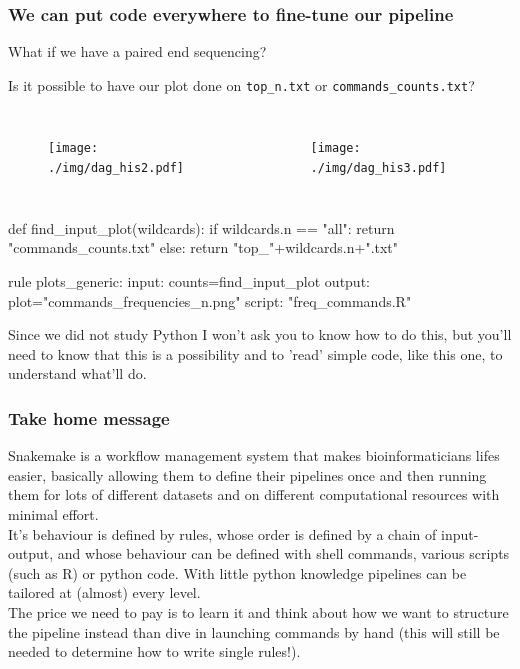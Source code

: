 \documentclass[xcolor=table]{beamer}
\begin{document}
\begin{frame}
\frametitle{We can put code everywhere to fine-tune our pipeline}
What if we have a paired end sequencing?

Is it possible to have our plot done on \texttt{top\_n.txt} or \texttt{commands\_counts.txt}?
\begin{columns}
\begin{figure}\texttt{[image: ./img/dag\_his2.pdf]}\end{figure}
\begin{figure}\texttt{[image: ./img/dag\_his3.pdf]}\end{figure}
\end{columns}
\end{frame}


\begin{frame}[fragile]
\begin{python}[basicstyle=\small]
def find_input_plot(wildcards):
   if wildcards.n == "all":
      return "commands_counts.txt"
   else:
      return "top_"+wildcards.n+".txt"

rule plots_generic:
   input: counts=find_input_plot
   output: plot="commands_frequencies_{n}.png"
   script: "freq_commands.R"
\end{python}
\tiny{Since we did not study Python I won't ask you to know how to do this, but you'll need to know that this is a possibility and to 'read' simple code,
like this one, to understand what'll do.}
\end{frame}


\begin{frame}
\frametitle{Take home message}
Snakemake is a workflow management system that makes bioinformaticians lifes easier, basically allowing them
to define their \textcolor{galon}{pipelines} once and then running them for lots of different datasets and on different
computational resources with minimal effort. \\
It's behaviour is defined by \textcolor{novak}{rules}, whose order is defined by a chain of input-output, and whose behaviour
can be defined with shell commands, various scripts (such as R) or python code. With little python knowledge pipelines can be tailored
at (almost) every level.
\\ The price we need to pay is to learn it and think about how we want to structure
the pipeline instead than dive in launching commands by hand (this will still be needed to determine how to write single rules!).
\end{frame}
\end{document}
